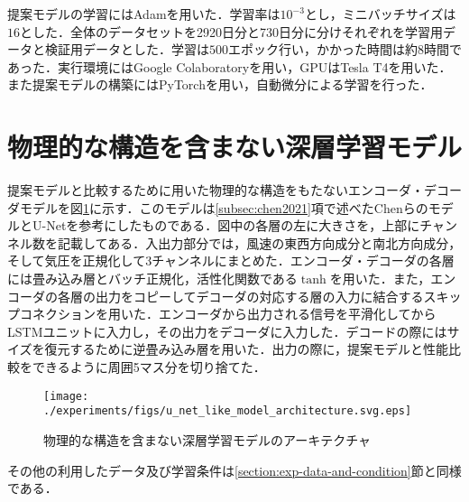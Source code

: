 
提案モデルの学習にはAdam\cite{Kingma2014AdamAM}を用いた．学習率は$10^{-3}$とし，ミニバッチサイズは$16$とした．全体のデータセットを2920日分と730日分に分けそれぞれを学習用データと検証用データとした．学習は$500$エポック行い，かかった時間は約8時間であった．実行環境にはGoogle Colaboratory\cite{GoogleColaboratory}を用い，GPUはTesla T4を用いた．また提案モデルの構築にはPyTorch\cite{NEURIPS2019-9015}を用い，自動微分による学習を行った．

\section{物理的な構造を含まない深層学習モデル \label{section:exp-encoder-decoder-model}}
提案モデルと比較するために用いた物理的な構造をもたないエンコーダ・デコーダモデルを図\ref{fig:exp-encoder-decoder-model}に示す．このモデルは\ref{subsec:chen2021}項で述べたChenらのモデルとU-Net\cite{journals/corr/RonnebergerFB15}を参考にしたものである．図中の各層の左に大きさを，上部にチャンネル数を記載してある．入出力部分では，風速の東西方向成分と南北方向成分，そして気圧を正規化して3チャンネルにまとめた．エンコーダ・デコーダの各層には畳み込み層とバッチ正規化\cite{10.5555/3045118.3045167}，活性化関数である$\tanh$を用いた．また，エンコーダの各層の出力をコピーしてデコーダの対応する層の入力に結合するスキップコネクションを用いた．エンコーダから出力される信号を平滑化してからLSTMユニットに入力し，その出力をデコーダに入力した．デコードの際にはサイズを復元するために逆畳み込み層を用いた．出力の際に，提案モデルと性能比較をできるように周囲5マス分を切り捨てた．

\begin{figure}[bp]
  \centering
  \texttt{[image: ./experiments/figs/u\_net\_like\_model\_architecture.svg.eps]}
  \caption{物理的な構造を含まない深層学習モデルのアーキテクチャ}
  \label{fig:exp-encoder-decoder-model}
\end{figure}

その他の利用したデータ及び学習条件は\ref{section:exp-data-and-condition}節と同様である．

